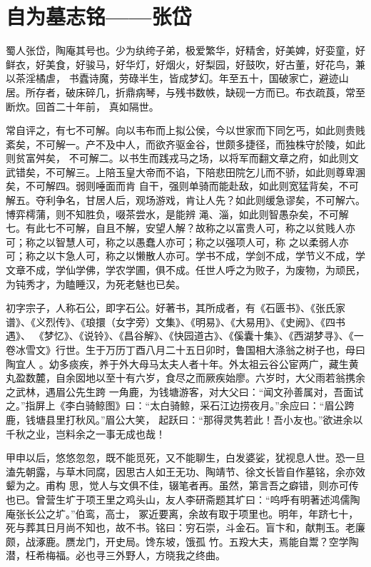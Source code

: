 \section{自为墓志铭——张岱}

蜀人张岱，陶庵其号也。少为纨绔子弟，极爱繁华，好精舍，好美婢，好娈童，好鲜衣，好美食，好骏马，好华灯，好烟火，好梨园，好鼓吹，好古董，好花鸟，兼以茶淫橘虐，
书蠹诗魔，劳碌半生，皆成梦幻。年至五十，国破家亡，避迹山居。所存者，破床碎几，折鼎病琴，与残书数帙，缺砚一方而已。布衣疏莨，常至断炊。回首二十年前，
真如隔世。

常自评之，有七不可解。向以韦布而上拟公侯，今以世家而下同乞丐，如此则贵贱紊矣，不可解一。产不及中人，而欲齐驱金谷，世颇多捷径，而独株守於陵，如此则贫富舛矣，
不可解二。以书生而践戎马之场，以将军而翻文章之府，如此则文武错矣，不可解三。上陪玉皇大帝而不谄，下陪悲田院乞儿而不骄，如此则尊卑溷矣，不可解四。弱则唾面而肯
自干，强则单骑而能赴敌，如此则宽猛背矣，不可解五。夺利争名，甘居人后，观场游戏，肯让人先？如此则缓急谬矣，不可解六。博弈樗蒲，则不知胜负，啜茶尝水，是能辨
渑、淄，如此则智愚杂矣，不可解七。有此七不可解，自且不解，安望人解？故称之以富贵人可，称之以贫贱人亦可；称之以智慧人可，称之以愚蠢人亦可；称之以强项人可，称
之以柔弱人亦可；称之以卞急人可，称之以懒散人亦可。学书不成，学剑不成，学节义不成，学文章不成，学仙学佛，学农学圃，俱不成。任世人呼之为败子，为废物，为顽民，
为钝秀才，为瞌睡汉，为死老魅也已矣。

初字宗子，人称石公，即字石公。好著书，其所成者，有《石匮书》、《张氏家谱》、《义烈传》、《琅擐（女字旁）文集》、《明易》、《大易用》、《史阙》、《四书遇》、
《梦忆》、《说铃》、《昌谷解》、《快园道古》、《傒囊十集》、《西湖梦寻》、《一卷冰雪文》行世。生于万历丁酉八月二十五日卯时，鲁国相大涤翁之树子也，母曰陶宜人
。幼多痰疾，养于外大母马太夫人者十年。外太祖云谷公宦两广，藏生黄丸盈数麓，自余囡地以至十有六岁，食尽之而厥疾始廖。六岁时，大父雨若翁携余之武林，遇眉公先生跨
一角鹿，为钱塘游客，对大父曰：“闻文孙善属对，吾面试之。”指屏上《李白骑鲸图》曰：“太白骑鲸，采石江边捞夜月。”余应曰：“眉公跨鹿，钱塘县里打秋风。”眉公大笑，
起跃曰：“那得灵隽若此！吾小友也。”欲进余以千秋之业，岂料余之一事无成也哉！

甲申以后，悠悠忽忽，既不能觅死，又不能聊生，白发婆娑，犹视息人世。恐一旦溘先朝露，与草木同腐，因思古人如王无功、陶靖节、徐文长皆自作墓铭，余亦效颦为之。甫构
思，觉人与文俱不佳，辍笔者再。虽然，第言吾之癖错，则亦可传也已。曾营生圹于项王里之鸡头山，友人李研斋题其圹曰：“呜呼有明著述鸿儒陶庵张长公之圹。”伯鸾，高士，
冢近要离，余故有取于项里也。明年，年跻七十，死与葬其日月尚不知也，故不书。铭曰：穷石崇，斗金石。盲卞和，献荆玉。老廉颇，战涿鹿。赝龙门，开史局。馋东坡，饿孤
竹。五羖大夫，焉能自鬻？空学陶潜，枉希梅福。必也寻三外野人，方晓我之终曲。